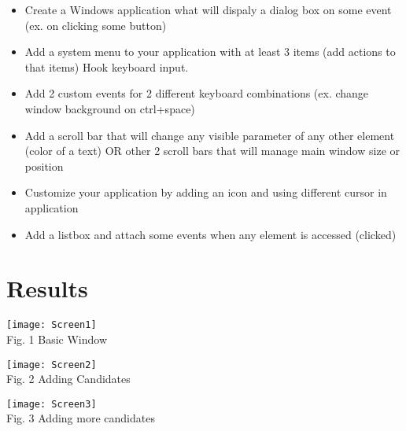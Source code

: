\documentclass[12pt]{article}
\begin{document}
  \begin{itemize}
    \renewcommand{\labelitemi}{$\circ$}
    \item Create a Windows application what will dispaly a dialog box on some event (ex. on clicking some button)
\item Add a system menu to your application with at least 3 items (add actions to that items)
Hook keyboard input. 
\item Add 2 custom events for 2 different keyboard combinations (ex. change window background on ctrl+space)
\item Add a scroll bar that will change any visible parameter of any other element (color of a text) OR other 2 scroll bars that will manage main window size or position
\item Customize your application by adding an icon and using different cursor in application
\item Add a listbox and attach some events when any element is accessed (clicked)
  \end{itemize}


  \section{Results}




\begin{minipage}[b]{1.0\linewidth}
      \begin{center}
        \texttt{[image: Screen1]}
         \\ Fig. 1 Basic Window
      \end{center}
    \end{minipage}

    \begin{minipage}[b]{1.0\linewidth}
      \begin{center}
        \texttt{[image: Screen2]}
         \\ Fig. 2 Adding Candidates
      \end{center}
    \end{minipage}
    \begin{minipage}[b]{1.0\linewidth}
      \begin{center}
        \texttt{[image: Screen3]}
         \\ Fig. 3 Adding more candidates
      \end{center}
    \end{minipage}
    
\end{document}
